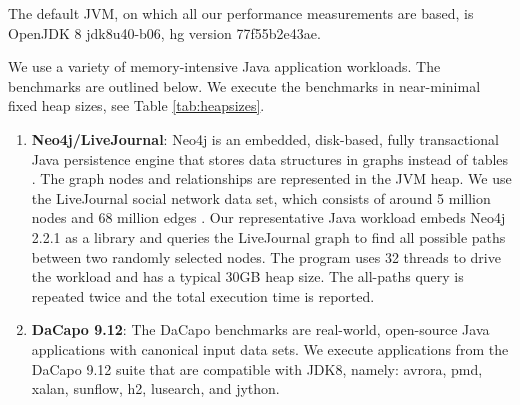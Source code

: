 The default JVM, on which all our performance measurements are based,
is OpenJDK 8 jdk8u40-b06, hg version 77f55b2e43ae. %

We use a variety of memory-intensive Java application workloads. 
The benchmarks are outlined below.
We execute the benchmarks in near-minimal fixed heap sizes, see
Table \ref{tab:heapsizes}.

\begin{enumerate}
\item[]\textbf{Neo4j/LiveJournal}: Neo4j is an embedded, disk-based, fully transactional Java persistence engine that stores data structures in graphs instead of tables \cite{Neo4j}.
The graph nodes and relationships are represented in the JVM heap.
We use the LiveJournal social network data set, which consists of around 5 million nodes and 68 million edges \cite{snapnets}.
Our representative Java workload embeds Neo4j 2.2.1 as a library and queries the LiveJournal graph to find all possible paths between two randomly selected nodes.
The program uses 32 threads to drive the workload and has a typical 30GB heap size.
The all-paths query is repeated twice and the total execution time is reported.
\item[]\textbf{DaCapo 9.12}: The DaCapo benchmarks are real-world, open-source Java applications with canonical input data sets. We execute applications from the DaCapo 9.12 suite \cite{blackburn06dacapo} that are compatible with JDK8, namely: avrora, pmd, xalan, sunflow, h2, lusearch, and jython.
\end{enumerate}